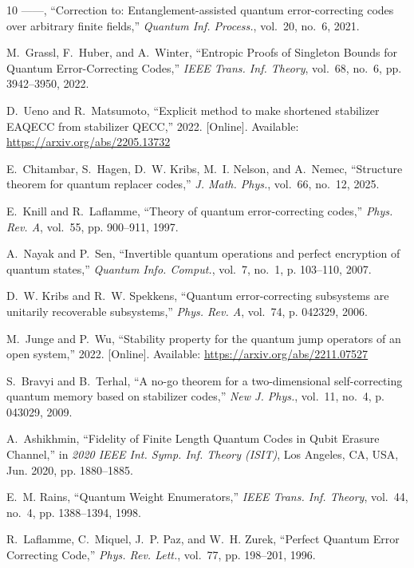 \documentclass[]{amsart}
\begin{document}
\begin{thebibliography}{10}
------, ``{Correction to: Entanglement-assisted quantum error-correcting codes over arbitrary finite fields},'' \emph{Quantum Inf. Process.}, vol.~20, no.~6, 2021.

M.~Grassl, F.~Huber, and A.~Winter, ``{Entropic Proofs of Singleton Bounds for Quantum Error-Correcting Codes},'' \emph{IEEE Trans. Inf. Theory}, vol.~68, no.~6, pp. 3942--3950, 2022.

\BIBentryALTinterwordspacing
D.~Ueno and R.~Matsumoto, ``{Explicit method to make shortened stabilizer EAQECC from stabilizer QECC},'' 2022. [Online]. Available: \url{https://arxiv.org/abs/2205.13732}
\BIBentrySTDinterwordspacing

E.~Chitambar, S.~Hagen, D.~W. Kribs, M.~I. Nelson, and A.~Nemec, ``{Structure theorem for quantum replacer codes},'' \emph{J. Math. Phys.}, vol.~66, no.~12, 2025.

E.~Knill and R.~Laflamme, ``{Theory of quantum error-correcting codes},'' \emph{Phys. Rev. A}, vol.~55, pp. 900--911, 1997.

A.~Nayak and P.~Sen, ``{Invertible quantum operations and perfect encryption of quantum states},'' \emph{Quantum Info. Comput.}, vol.~7, no.~1, p. 103–110, 2007.

D.~W. Kribs and R.~W. Spekkens, ``{Quantum error-correcting subsystems are unitarily recoverable subsystems},'' \emph{Phys. Rev. A}, vol.~74, p. 042329, 2006.

\BIBentryALTinterwordspacing
M.~Junge and P.~Wu, ``{Stability property for the quantum jump operators of an open system},'' 2022. [Online]. Available: \url{https://arxiv.org/abs/2211.07527}
\BIBentrySTDinterwordspacing

S.~Bravyi and B.~Terhal, ``{A no-go theorem for a two-dimensional self-correcting quantum memory based on stabilizer codes},'' \emph{New J. Phys.}, vol.~11, no.~4, p. 043029, 2009.

A.~Ashikhmin, ``{Fidelity of Finite Length Quantum Codes in Qubit Erasure Channel},'' in \emph{2020 IEEE Int. Symp. Inf. Theory (ISIT)}, Los Angeles, CA, USA, Jun. 2020, pp. 1880--1885.

E.~M. Rains, ``{Quantum Weight Enumerators},'' \emph{IEEE Trans. Inf. Theory}, vol.~44, no.~4, pp. 1388--1394, 1998.

R.~Laflamme, C.~Miquel, J.~P. Paz, and W.~H. Zurek, ``{Perfect Quantum Error Correcting Code},'' \emph{Phys. Rev. Lett.}, vol.~77, pp. 198--201, 1996.


\end{thebibliography}
\end{document}
